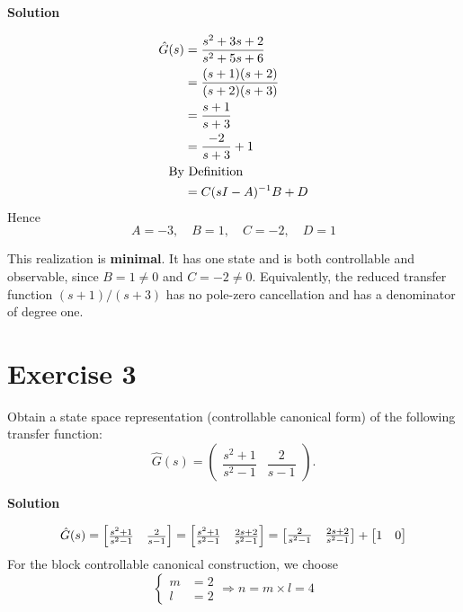 \documentclass[12pt,a4paper]{article}
\begin{document}
\textbf{Solution}

\begin{align*}
	\hat G(s) &= \frac{s^2+3s+2}{s^2+5s+6} \\ 
	& =  { (s + 1)(s + 2) \over (s + 2) (s + 3) }\\
	&=  { s + 1 \over s + 3} \\
	&= {-2 \over s+ 3} + 1\\
	\text {By} & \text{ Definition} \\
	&= C(sI - A)^{-1} B + D
\end{align*}
Hence
\[
A = -3, \quad B = 1, \quad C = -2, \quad D = 1
\]

This realization is \textbf{minimal}. It has one state and is both controllable
and observable, since $B=1\neq 0$ and $C=-2\neq 0$. Equivalently, the reduced
transfer function $(s+1)/(s+3)$ has no pole-zero cancellation and has a
denominator of degree one.

\par\nopagebreak\vspace{3cm}

\Needspace{8cm}
\section*{Exercise 3}
Obtain a state space representation (controllable canonical form) of the following
transfer function:
\[
\hat G(s)=
\begin{pmatrix}
\dfrac{s^2+1}{s^2-1} & \dfrac{2}{s-1}
\end{pmatrix}.
\]

\textbf{Solution}

\[
\hat G(s) = \begin{bmatrix}
	\frac{s^2+1}{s^2-1} & \frac{2}{s-1}
\end{bmatrix} = \begin{bmatrix}
{ s^2 + 1 \over s^2 -1 } & {  2s + 2 \over s^2 -1 }
\end{bmatrix} = \begin{bmatrix}
{ 2  \over s^2 -1 } & {  2s + 2 \over s^2 -1 }
\end{bmatrix} + \begin{bmatrix}
1 & 0
\end{bmatrix}
\]
For the block controllable canonical construction, we choose
\[
\begin{cases}
	m &= 2 \\
	l&= 2
\end{cases} \Rightarrow n = m \times l = 4
\]
\end{document}
